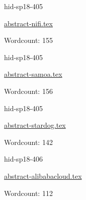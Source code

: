 

\begin{IU}

hid-sp18-405

\href{https://github.com/cloudmesh-community/hid-sp18-405/blob/master//technology/abstract-nifi.tex}{abstract-nifi.tex}

 

Wordcount: 155

\end{IU}



\begin{IU}

hid-sp18-405

\href{https://github.com/cloudmesh-community/hid-sp18-405/blob/master//technology/abstract-samoa.tex}{abstract-samoa.tex}

 

Wordcount: 156

\end{IU}



\begin{IU}

hid-sp18-405

\href{https://github.com/cloudmesh-community/hid-sp18-405/blob/master//technology/abstract-stardog.tex}{abstract-stardog.tex}

 

Wordcount: 142

\end{IU}



\begin{IU}

hid-sp18-406

\href{https://github.com/cloudmesh-community/hid-sp18-406/blob/master//technology/abstract-alibabacloud.tex}{abstract-alibabacloud.tex}

 

Wordcount: 112

\end{IU}



